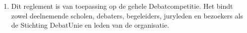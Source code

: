 
\begin{enumerate}
\item Dit reglement is van toepassing op de gehele Debatcompetitie. Het bindt zowel deelnemende scholen, debaters, begeleiders, juryleden en bezoekers als de Stichting DebatUnie en leden van de organisatie.
\end{enumerate}
